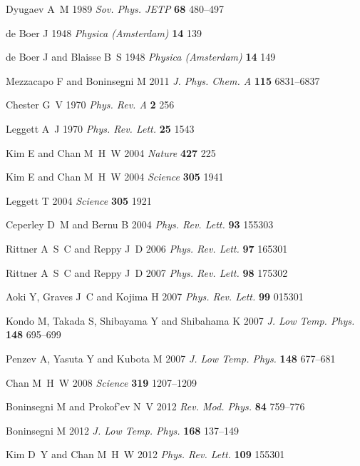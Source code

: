 \documentclass[12pt]{iopart}
\begin{document}
\begin{thebibliography}{100}
Dyugaev A~M 1989 {\em Sov. Phys. JETP\/} {\bf 68} 480--497

{de Boer} J 1948 {\em Physica (Amsterdam)\/} {\bf 14} 139

{de Boer} J and Blaisse B~S 1948 {\em Physica (Amsterdam)\/} {\bf 14} 149

Mezzacapo F and Boninsegni M 2011 {\em J. Phys. Chem. A\/} {\bf 115} 6831--6837

Chester G~V 1970 {\em Phys. Rev. A\/} {\bf 2} 256

Leggett A~J 1970 {\em Phys. Rev. Lett.\/} {\bf 25} 1543

Kim E and Chan M~H~W 2004 {\em Nature\/} {\bf 427} 225

Kim E and Chan M~H~W 2004 {\em Science\/} {\bf 305} 1941

Leggett T 2004 {\em Science\/} {\bf 305} 1921

Ceperley D~M and Bernu B 2004 {\em Phys. Rev. Lett.\/} {\bf 93} 155303

Rittner A~S~C and Reppy J~D 2006 {\em Phys. Rev. Lett.\/} {\bf 97} 165301

Rittner A~S~C and Reppy J~D 2007 {\em Phys. Rev. Lett.\/} {\bf 98} 175302

Aoki Y, Graves J~C and Kojima H 2007 {\em Phys. Rev. Lett.\/} {\bf 99} 015301

Kondo M, Takada S, Shibayama Y and Shibahama K 2007 {\em J. Low Temp. Phys.\/}
  {\bf 148} 695--699

Penzev A, Yasuta Y and Kubota M 2007 {\em J. Low Temp. Phys.\/} {\bf 148}
  677--681

Chan M~H~W 2008 {\em Science\/} {\bf 319} 1207--1209

Boninsegni M and Prokof'ev N~V 2012 {\em Rev. Mod. Phys.\/} {\bf 84} 759--776

Boninsegni M 2012 {\em J. Low Temp. Phys.\/} {\bf 168} 137--149

Kim D~Y and Chan M~H~W 2012 {\em Phys. Rev. Lett.\/} {\bf 109} 155301


\end{thebibliography}
\end{document}
